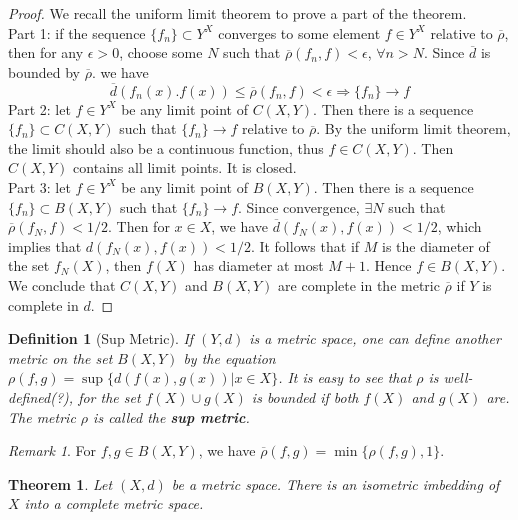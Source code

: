 \documentclass[article,11pt, reqno]{article}
\newtheorem*{theorem}{Theorem}
\newtheorem*{definition}{Definition}
\theoremstyle{remark}
\newtheorem*{remark}{Remark}
\newcommand{\Ra}{\Rightarrow}
\newcommand{\ra}{\rightarrow}
\newcommand{\<}{\langle}
\renewcommand{\>}{\rangle}
\begin{document}
\begin{proof}
    We recall the uniform limit theorem to prove a part of the theorem.\\
    Part 1: if the sequence $\{f_n\}\subset Y^X$ converges to some element $f\in Y^X$ relative to $\overline{\rho}$, then for any $\epsilon>0$, choose some $N$ such that $\overline{\rho}(f_n,f) <\epsilon$, $\forall n>N$. Since $\overline{d}$ is bounded by $\overline{\rho}$. we have 
    $$
        \overline{d}(f_n(x).f(x))\leq\overline{\rho}(f_n,f)<\epsilon \Ra \{f_n\}\ra f
    $$
    Part 2: let $f\in Y^X$ be any limit point of $C(X,Y)$. Then there is a sequence $\{f_n\}\subset C(X,Y)$ such that $\{f_n\}\ra f$ relative to $\overline{\rho}$. By the uniform limit theorem, the limit should also be a continuous function, thus $f\in C(X,Y)$. Then $C(X,Y)$ contains all limit points. It is closed.\\
    Part 3: let $f\in Y^X$ be any limit point of $B(X,Y)$. Then there is a sequence $\{f_n\}\subset B(X,Y)$ such that $\{f_n\}\ra f$. 
    Since convergence, $\exists N$ such that $\overline{\rho}(f_N, f)<1/2$. 
    Then for $x\in X$, we have $\overline{d}( f_N (x), f (x)) < 1/2$, which implies that $d( f_N (x), f (x)) < 1/2$. It follows that if $M$ is the diameter of the set $f_N (X)$, then $f (X)$ has diameter at most $M + 1$.
    Hence $f\in B(X, Y )$.\\ 
    We conclude that $C(X, Y )$ and $B(X, Y )$ are complete in the metric $\overline{\rho}$ if $Y$ is complete in $d$.
\end{proof}
\begin{definition}[Sup Metric]
    If $(Y,d)$ is a metric space, one can define another metric on the set $B(X, Y )$ by the equation $\rho( f, g) = \sup\{d( f (x), g(x)) | x\in X\}$. It is easy to see that $\rho$ is well-defined(?), for the set $f (X)\cup g(X)$ is bounded if both $f (X)$ and $g(X)$ are. The metric $\rho$ is called the \textbf{sup metric}.
\end{definition}
\begin{remark}
    For $f,g\in B(X,Y)$, we have $\overline{\rho}( f, g) = \min\{\rho( f, g), 1\}$.
\end{remark}
\begin{theorem}
    Let $(X, d)$ be a metric space. There is an isometric imbedding of $X$ into a complete metric space.
\end{theorem}
\end{document}
